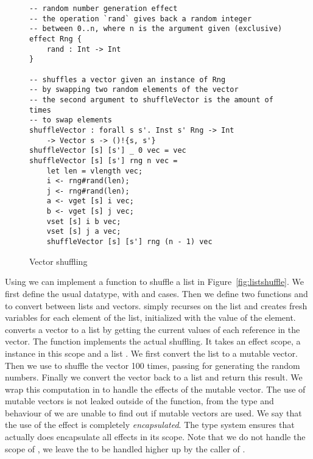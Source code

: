 \begin{figure}[H]
\caption{Vector shuffling}
\begin{verbatim}
-- random number generation effect
-- the operation `rand` gives back a random integer
-- between 0..n, where n is the argument given (exclusive)
effect Rng {
	rand : Int -> Int
}

-- shuffles a vector given an instance of Rng
-- by swapping two random elements of the vector
-- the second argument to shuffleVector is the amount of times
-- to swap elements
shuffleVector : forall s s'. Inst s' Rng -> Int
	-> Vector s -> ()!{s, s'}
shuffleVector [s] [s'] _ 0 vec = vec
shuffleVector [s] [s'] rng n vec =
	let len = vlength vec;
	i <- rng#rand(len);
	j <- rng#rand(len);
	a <- vget [s] i vec;
	b <- vget [s] j vec;
	vset [s] i b vec;
	vset [s] j a vec;
	shuffleVector [s] [s'] rng (n - 1) vec
\end{verbatim}
\label{fig:shuffle}
\end{figure}

Using  we can implement a function to shuffle a list in Figure~\ref{fig:listshuffle}.
We first define the usual  datatype, with  and  cases.
Then we define two functions  and  to convert between lists and vectors.
 simply recurses on the list and creates fresh variables for each element of the list, initialized with the value of the element.
 converts a vector to a list by getting the current values of each reference in the vector.
The function  implements the actual shuffling.
It takes an effect scope, a  instance  in this scope and a list .
We first convert the list to a mutable vector.
Then we use  to shuffle the vector 100 times, passing  for generating the random numbers.
Finally we convert the vector back to a list and return this result.
We wrap this computation in  to handle the effects of the mutable vector.
The use of mutable vectors is not leaked outside of the function, from the type and behaviour of  we are unable to find out if mutable vectors are used.
We say that the use of the  effect is completely \emph{encapsulated}.
The type system ensures that  actually does encapsulate all effects in its scope.
Note that we do not handle the scope of , we leave the  to be handled higher up by the caller of .

